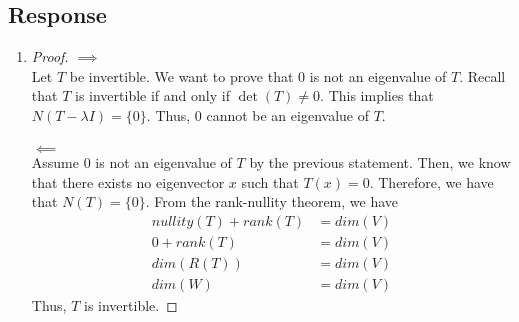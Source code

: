 \documentclass[13pt]{article}
\begin{document}
\subsection*{Response}
\begin{enumerate}[label=(\alph*),leftmargin=*]
\item
  \begin{proof}
    $\implies$ \\
    Let $T$ be invertible. We want to prove that $0$ is not an eigenvalue of $T$. Recall that $T$ is invertible if and only if $\det(T) \neq 0$. This implies that $N(T - \lambda I) = \{ 0 \}$. Thus, $0$ cannot be an eigenvalue of $T$. \\ \\
    $\impliedby$ \\
    Assume $0$ is not an eigenvalue of $T$ by the previous statement. Then, we know that there exists no eigenvector $x$ such that $T(x) = 0$. Therefore, we have that $N(T) = \{ 0 \}$. From the rank-nullity theorem, we have
    \begin{align*}
      nullity(T) + rank(T) &= dim(V) \\
      0 + rank(T) &= dim(V) \\
      dim(R(T)) &= dim(V) \\
      dim(W) &= dim(V)
    \end{align*}
    Thus, $T$ is invertible.
  \end{proof}


\end{enumerate}
\end{document}
